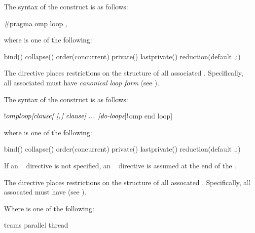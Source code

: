 \syntax
\begin{ccppspecific}
The syntax of the  construct is as follows:
\begin{ompcPragma}
#pragma omp loop \plc{[clause[ [},\plc{] clause] ... ] new-line}
\end{ompcPragma}

where  is one of the following:

\begin{indentedcodelist}
bind()
collapse()
order(concurrent)
private()
lastprivate()
reduction(\plc{[}default ,\plc{]reduction-identifier }:)
\end{indentedcodelist}
The  directive places restrictions on the structure of all associated .
Specifically, all associated  must have \emph{canonical loop form} (see
).
\end{ccppspecific}

\begin{fortranspecific}
The syntax of the  construct is as follows:

\begin{ompfPragma}
!$omp loop \plc{[clause[ [},\plc{] clause] ... ]}
   \plc{do-loops}
[!$omp end loop]
\end{ompfPragma}

\begin{samepage}
where  is one of the following:

\begin{indentedcodelist}
bind()
collapse()
order(concurrent)
private()
lastprivate()
reduction(\plc{[}default ,\plc{]reduction-identifier }:)
\end{indentedcodelist}
\end{samepage}

If an ~ directive is not specified, an
  ~ directive is assumed at the end of the
.

The  directive places restrictions on the structure of all
assocated . Specifically, all assocated  must
have  (see ).
\end{fortranspecific}

Where  is one of the following:
\begin{indentedcodelist}
  teams
  parallel
  thread
\end{indentedcodelist}


